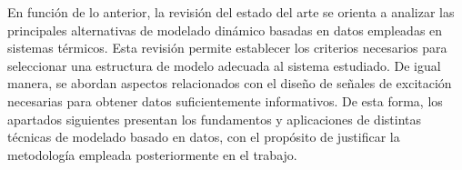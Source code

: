 \documentclass[11pt]{report}
\begin{document}
En función de lo anterior, la revisión del estado del arte se orienta a analizar las principales alternativas de modelado dinámico basadas en datos empleadas en sistemas térmicos. Esta revisión permite establecer los criterios necesarios para seleccionar una estructura de modelo adecuada al sistema estudiado. De igual manera, se abordan aspectos relacionados con el diseño de señales de excitación necesarias para obtener datos suficientemente informativos. De esta forma, los apartados siguientes presentan los fundamentos y aplicaciones de distintas técnicas de modelado basado en datos, con el propósito de justificar la metodología empleada posteriormente en el trabajo.

\end{document}
